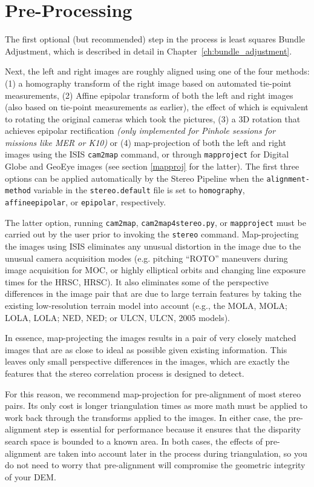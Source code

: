 \section{Pre-Processing}

The first optional (but recommended) step in the process is least
squares Bundle Adjustment, which is described in detail in
Chapter~\ref{ch:bundle_adjustment}.

Next, the left and right images are roughly aligned using one of the four
methods: (1) a homography transform of the right image based on
automated tie-point measurements, (2) Affine epipolar transform of both
the left and right images (also based on tie-point measurements as earlier),
the effect of which is equivalent to rotating
the original cameras which took the pictures, (3) a 3D rotation that achieves
epipolar rectification {\it(only implemented for Pinhole sessions for
  missions like MER or K10)} or (4) map-projection of both the left
and right images using the \ac{ISIS} \texttt{cam2map} command, or
through \texttt{mapproject} for Digital Globe and GeoEye images (see
section \ref{mapproj} for the latter).
The first three options can be applied automatically by the Stereo
Pipeline when the \texttt{alignment-method} variable in the
\texttt{stereo.default} file is set to \texttt{homography}, 
\texttt{affineepipolar}, or \texttt{epipolar}, respectively.

The latter option, running {\tt cam2map}, {\tt cam2map4stereo.py}, or
{\tt mapproject} must be carried out by the user prior to
invoking the {\tt stereo} command.  Map-projecting the images using
\ac{ISIS} eliminates any unusual distortion in the image due to the
unusual camera acquisition modes (e.g. pitching ``ROTO'' maneuvers
during image acquisition for \ac{MOC}, or highly elliptical orbits and
changing line exposure times for the \acl{HRSC}, \acs{HRSC}).  It also
eliminates some of the perspective differences in the image pair that
are due to large terrain features by taking the existing low-resolution
terrain model into account (e.g., the \acl{MOLA}, \acs{MOLA};
\acl{LOLA}, \acs{LOLA}; \acl {NED}, \acs {NED}; or \acl{ULCN},
\acs{ULCN}, 2005 models).

In essence, map-projecting the images results in a pair of very
closely matched images that are as close to ideal as possible given
existing information. This leaves only small perspective differences
in the images, which are exactly the features that the stereo
correlation process is designed to detect.

For this reason, we recommend map-projection for pre-alignment of most
stereo pairs. Its only cost is longer triangulation times as more math
must be applied to work back through the transforms applied to the images. In
either case, the pre-alignment step is essential for performance
because it ensures that the disparity search space is bounded to a
known area.  In both cases, the effects of pre-alignment are taken
into account later in the process during triangulation, so you do not
need to worry that pre-alignment will compromise the geometric
integrity of your \ac{DEM}.

